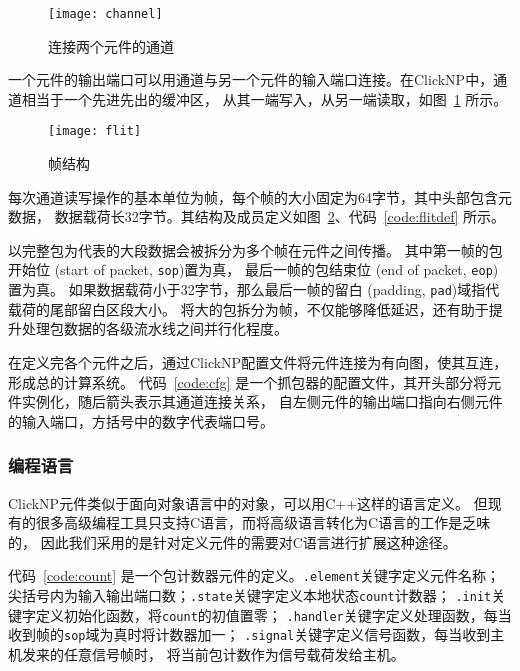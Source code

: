 \begin{figure}[htbp]
\centering
\texttt{[image: channel]}
\caption{连接两个元件的通道}\label{fig:channel}
\end{figure}

一个元件的输出端口可以用通道与另一个元件的输入端口连接。在ClickNP中，通道相当于一个先进先出的缓冲区，
从其一端写入，从另一端读取，如图~\ref{fig:channel} 所示。

\begin{figure}[htbp]
\centering
\texttt{[image: flit]}
\caption{帧结构}\label{fig:flit}
\end{figure}



每次通道读写操作的基本单位为帧，每个帧的大小固定为64字节，其中头部包含元数据，
数据载荷长32字节。其结构及成员定义如图~\ref{fig:flit}、代码~\ref{code:flitdef} 所示。

以完整包为代表的大段数据会被拆分为多个帧在元件之间传播。
其中第一帧的包开始位 (start of packet, \lstinline$sop$)置为真，
最后一帧的包结束位 (end of packet, \lstinline$eop$)置为真。
如果数据载荷小于32字节，那么最后一帧的留白 (padding, \lstinline$pad$)域指代载荷的尾部留白区段大小。
将大的包拆分为帧，不仅能够降低延迟，还有助于提升处理包数据的各级流水线之间并行化程度。

在定义完各个元件之后，通过ClickNP配置文件将元件连接为有向图，使其互连，形成总的计算系统。
代码~\ref{code:cfg} 是一个抓包器的配置文件，其开头部分将元件实例化，随后箭头表示其通道连接关系，
自左侧元件的输出端口指向右侧元件的输入端口，方括号中的数字代表端口号。
\begin{figure}[htbp]
\centering

\end{figure}

\subsubsection{编程语言}
ClickNP元件类似于面向对象语言中的对象，可以用C++这样的语言定义。
但现有的很多高级编程工具只支持C语言，而将高级语言转化为C语言的工作是乏味的，
因此我们采用的是针对定义元件的需要对C语言进行扩展这种途径。


代码~\ref{code:count} 是一个包计数器元件的定义。\lstinline$.element$关键字定义元件名称；
尖括号内为输入输出端口数；\lstinline$.state$关键字定义本地状态\lstinline$count$计数器；
\lstinline$.init$关键字定义初始化函数，将\lstinline$count$的初值置零；
\lstinline$.handler$关键字定义处理函数，每当收到帧的\lstinline$sop$域为真时将计数器加一；
\lstinline$.signal$关键字定义信号函数，每当收到主机发来的任意信号帧时，
将当前包计数作为信号载荷发给主机。

